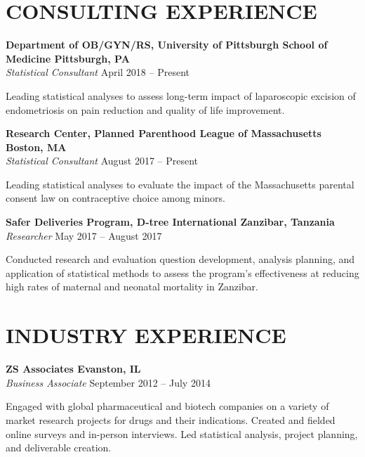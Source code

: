 \documentclass[12pt]{article}
\begin{document}
\section*{\textbf{{\large C}{ONSULTING} {\large E}{XPERIENCE}}}
\textbf{Department of OB/GYN/RS, University of Pittsburgh School of Medicine \hfill \hfill Pittsburgh, PA}  \\
\textit{ Statistical Consultant} \hfill \hfill April 2018 -- Present
\begin{addmargin}[1em]{2em} Leading statistical analyses to assess long-term impact of laparoscopic excision of endometriosis on pain reduction and quality of life improvement. \\ \end{addmargin} 

\textbf{Research Center, Planned Parenthood League of Massachusetts \hfill \hfill Boston, MA}  \\
\textit{ Statistical Consultant} \hfill \hfill August 2017 -- Present
\begin{addmargin}[1em]{2em} Leading statistical analyses to evaluate the impact of the Massachusetts parental consent law on contraceptive choice among minors. \\ \end{addmargin} 

\textbf{Safer Deliveries Program, D-tree International \hfill \hfill Zanzibar, Tanzania} \\
\textit{Researcher} \hfill \hfill May 2017 -- August 2017 
\begin{addmargin}[1em]{2em} Conducted research and evaluation question development, analysis planning, and application of statistical methods to assess the program's effectiveness at reducing high rates of maternal and neonatal mortality in Zanzibar. \end{addmargin}

\section*{\textbf{{\large I}{NDUSTRY} {\large E}{XPERIENCE}}}
\textbf{ZS Associates \hfill \hfill Evanston, IL} \\
\textit{Business Associate} \hfill \hfill September 2012 -- July 2014
\begin{addmargin}[1em]{2em} 
	Engaged with global pharmaceutical and biotech companies on a variety of market research projects for drugs and their indications. Created and fielded online surveys and in-person interviews. Led statistical analysis, project planning, and deliverable creation.
\end{addmargin}
\end{document}
